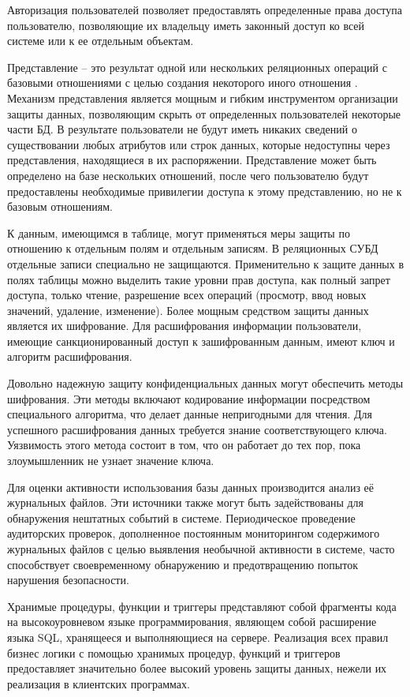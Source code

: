Авторизация пользователей позволяет предоставлять определенные права доступа пользователю, позволяющие их владельцу иметь законный доступ ко всей системе или к ее отдельным объектам.

Представление -- это результат одной или нескольких реляционных операций с базовыми отношениями с целью создания некоторого иного отношения \autocite[с. 12]{Skakun}. Механизм представления является мощным и гибким инструментом организации защиты данных, позволяющим скрыть от определенных пользователей некоторые части БД. В результате пользователи не будут иметь никаких сведений о существовании любых атрибутов или строк данных, которые недоступны через представления, находящиеся в их распоряжении. Представление может быть определено на базе нескольких отношений, после чего пользователю будут предоставлены необходимые привилегии доступа к этому представлению, но не к базовым отношениям. 

К данным, имеющимся в таблице, могут применяться меры защиты по отношению к отдельным полям и отдельным записям. В реляционных СУБД отдельные записи специально не защищаются. Применительно к защите данных в полях таблицы можно выделить такие уровни прав доступа, как полный запрет доступа, только чтение, разрешение всех операций (просмотр, ввод новых значений, удаление, изменение). Более мощным средством защиты данных является их шифрование. Для расшифрования информации пользователи, имеющие санкционированный доступ к зашифрованным данным, имеют ключ и алгоритм расшифрования.

Довольно надежную защиту конфиденциальных данных могут обеспечить методы шифрования. Эти методы включают кодирование информации посредством специального алгоритма, что делает данные непригодными для чтения. Для успешного расшифрования данных требуется знание соответствующего ключа. Уязвимость этого метода состоит в том, что он работает до тех пор, пока злоумышленник не узнает значение ключа.

Для оценки активности использования базы данных производится анализ её журнальных файлов. Эти источники также могут быть задействованы для обнаружения нештатных событий в системе. Периодическое проведение аудиторских проверок, дополненное постоянным мониторингом содержимого журнальных файлов с целью выявления необычной активности в системе, часто способствует своевременному обнаружению и предотвращению попыток нарушения безопасности.

Хранимые процедуры, функции и триггеры представляют собой фрагменты кода на высокоуровневом языке программирования, являющем собой расширение языка SQL, хранящееся и выполняющиеся на сервере. Реализация всех правил бизнес логики с помощью хранимых процедур, функций и триггеров предоставляет значительно более высокий уровень защиты данных, нежели их реализация в клиентских программах.


